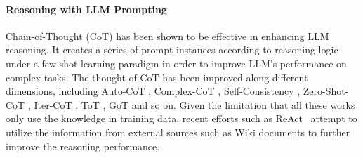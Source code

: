 \documentclass{article} %
\begin{document}
\paragraph{Reasoning with LLM Prompting}
Chain-of-Thought (CoT) \citep{COT} has been shown to be effective in enhancing LLM reasoning. It creates a series of prompt instances according to reasoning logic under a few-shot learning paradigm in order to improve LLM's performance on complex tasks. The thought of CoT has been improved along different dimensions, including Auto-CoT \citep{auto}, Complex-CoT \citep{complex_cot}, Self-Consistency \citep{self_consistency}, Zero-Shot-CoT \citep{zero_shot_cot}, Iter-CoT \citep{iter-cot}, ToT \citep{tot}, GoT \citep{got} and so on. Given the limitation that all these works only use the knowledge in training data, recent efforts such as ReAct~\citep{yao2022react} attempt to utilize the information from external sources such as Wiki documents to further improve the reasoning performance. 



\end{document}
